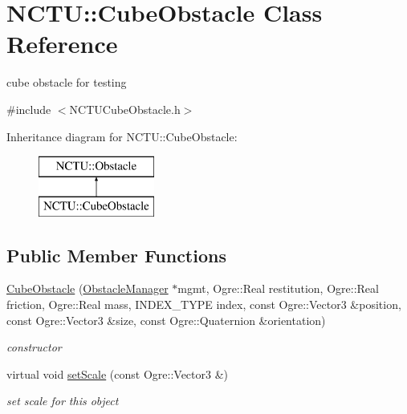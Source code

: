 \hypertarget{class_n_c_t_u_1_1_cube_obstacle}{}\section{N\+C\+TU\+:\+:Cube\+Obstacle Class Reference}
\label{class_n_c_t_u_1_1_cube_obstacle}


cube obstacle for testing  




{\ttfamily \#include $<$N\+C\+T\+U\+Cube\+Obstacle.\+h$>$}

Inheritance diagram for N\+C\+TU\+:\+:Cube\+Obstacle\+:\begin{figure}[H]
\begin{center}
\leavevmode
\includegraphics[height=2.000000cm]{class_n_c_t_u_1_1_cube_obstacle}
\end{center}
\end{figure}
\subsection*{Public Member Functions}
\begin{DoxyCompactItemize}
\item 
\hyperlink{class_n_c_t_u_1_1_cube_obstacle_ac6d8fba5dc23abaebe8c07bc3175c75a}{Cube\+Obstacle} (\hyperlink{class_n_c_t_u_1_1_obstacle_manager}{Obstacle\+Manager} $\ast$mgmt, Ogre\+::\+Real restitution, Ogre\+::\+Real friction, Ogre\+::\+Real mass, I\+N\+D\+E\+X\+\_\+\+T\+Y\+PE index, const Ogre\+::\+Vector3 \&position, const Ogre\+::\+Vector3 \&size, const Ogre\+::\+Quaternion \&orientation)
\begin{DoxyCompactList}\small\item\em constructor \end{DoxyCompactList}\item 
virtual void \hyperlink{class_n_c_t_u_1_1_cube_obstacle_a739b5db3f9338a13ddd40471f3e0d3b0}{set\+Scale} (const Ogre\+::\+Vector3 \&)\hypertarget{class_n_c_t_u_1_1_cube_obstacle_a739b5db3f9338a13ddd40471f3e0d3b0}{}\label{class_n_c_t_u_1_1_cube_obstacle_a739b5db3f9338a13ddd40471f3e0d3b0}

\begin{DoxyCompactList}\small\item\em set scale for this object \end{DoxyCompactList}\end{DoxyCompactItemize}
